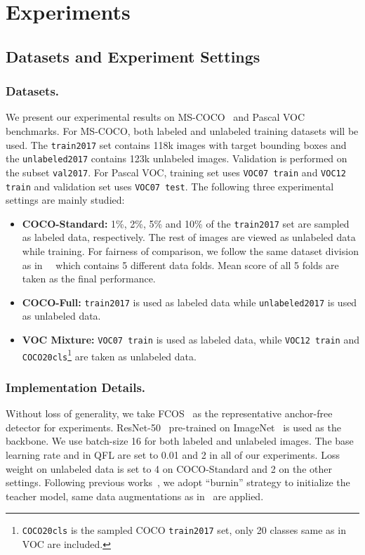 \documentclass[runningheads]{llncs}
\begin{document}
\section{Experiments}




\subsection{Datasets and Experiment Settings}
\subsubsection{Datasets.}
We present our experimental results on MS-COCO~\cite{coco} and Pascal VOC~\cite{voc} benchmarks. For MS-COCO, both labeled and unlabeled training datasets will be used. The \texttt{train2017} set contains 118k images with target bounding boxes and the \texttt{unlabeled2017} contains 123k unlabeled images. Validation is performed on the subset \texttt{val2017}. For Pascal VOC, training set uses \texttt{VOC07 train} and \texttt{VOC12 train} and validation set uses \texttt{VOC07 test}. The following three experimental settings are mainly studied: \\
\begin{itemize}
	\item {\bf COCO-Standard: } 1\%, 2\%, 5\% and 10\% of the \texttt{train2017} set are sampled as labeled data, respectively. The rest of images are viewed as unlabeled data while training. 
	For fairness of comparison, we follow the same dataset division as in~~\cite{ubteacher} which contains 5 different data folds. Mean score of all 5 folds are taken as the final performance.
	\item {\bf COCO-Full: } \texttt{train2017} is used as labeled data while \texttt{unlabeled2017} is used as unlabeled data.
	\item {\bf VOC Mixture:} \texttt{VOC07 train} is used as labeled data, while \texttt{VOC12 train} and \texttt{COCO20cls}\footnote{\texttt{COCO20cls} is the sampled COCO \texttt{train2017} set, only 20 classes same as in VOC are included.} are taken as unlabeled data.
\end{itemize}
\subsubsection{Implementation Details.}
Without loss of generality, we take FCOS~\cite{fcos} as the representative anchor-free detector for experiments. ResNet-50~\cite{resnet} pre-trained on ImageNet~\cite{imagenet} is used as the backbone. We use batch-size 16 for both labeled and unlabeled images. The base learning rate and  in QFL are set to 0.01 and 2 in all of our experiments. Loss weight  on unlabeled data is set to 4 on COCO-Standard and 2 on the other settings. Following previous works~\cite{ubteacher,stac}, we adopt ``burnin'' strategy to initialize the teacher model, same data augmentations as in~\cite{ubteacher} are applied.
\end{document}
